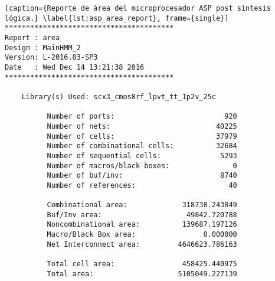 \begin{lstlisting}[caption={Reporte de área del microprocesador ASP post síntesis lógica.} \label{lst:asp_area_report}, frame={single}]
****************************************
Report : area
Design : MainHMM_2
Version: L-2016.03-SP3
Date   : Wed Dec 14 13:21:38 2016
****************************************

	Library(s) Used: scx3_cmos8rf_lpvt_tt_1p2v_25c

          Number of ports:                          920
          Number of nets:                         40225
          Number of cells:                        37979
          Number of combinational cells:          32684
          Number of sequential cells:              5293
          Number of macros/black boxes:               0
          Number of buf/inv:                       8740
          Number of references:                      40

          Combinational area:             318738.243849
          Buf/Inv area:                    49842.720788
          Noncombinational area:          139687.197126
          Macro/Black Box area:                0.000000
          Net Interconnect area:         4646623.786163

          Total cell area:                458425.440975
          Total area:                    5105049.227139
\end{lstlisting}


